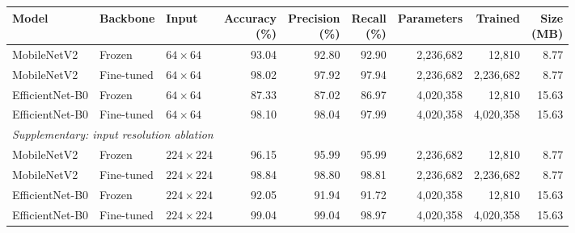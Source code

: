\begin{tabular}{lllrrrrrr}
\toprule
Model & Backbone & Input & \shortstack[r]{Accuracy\\(\%)} & \shortstack[r]{Precision\\(\%)} & \shortstack[r]{Recall\\(\%)} & Parameters & Trained & \shortstack[r]{Size\\(MB)} \\
\midrule
MobileNetV2 & Frozen & $64\times64$ & 93.04 & 92.80 & 92.90 & 2{,}236{,}682 & 12{,}810 & 8.77 \\
MobileNetV2 & Fine-tuned & $64\times64$ & 98.02 & 97.92 & 97.94 & 2{,}236{,}682 & 2{,}236{,}682 & 8.77 \\
EfficientNet-B0 & Frozen & $64\times64$ & 87.33 & 87.02 & 86.97 & 4{,}020{,}358 & 12{,}810 & 15.63 \\
EfficientNet-B0 & Fine-tuned & $64\times64$ & 98.10 & 98.04 & 97.99 & 4{,}020{,}358 & 4{,}020{,}358 & 15.63 \\
\midrule
\multicolumn{9}{l}{\textit{Supplementary: input resolution ablation}} \\
MobileNetV2 & Frozen & $224\times224$ & 96.15 & 95.99 & 95.99 & 2{,}236{,}682 & 12{,}810 & 8.77 \\
MobileNetV2 & Fine-tuned & $224\times224$ & 98.84 & 98.80 & 98.81 & 2{,}236{,}682 & 2{,}236{,}682 & 8.77 \\
EfficientNet-B0 & Frozen & $224\times224$ & 92.05 & 91.94 & 91.72 & 4{,}020{,}358 & 12{,}810 & 15.63 \\
EfficientNet-B0 & Fine-tuned & $224\times224$ & 99.04 & 99.04 & 98.97 & 4{,}020{,}358 & 4{,}020{,}358 & 15.63 \\
\bottomrule
\end{tabular}
